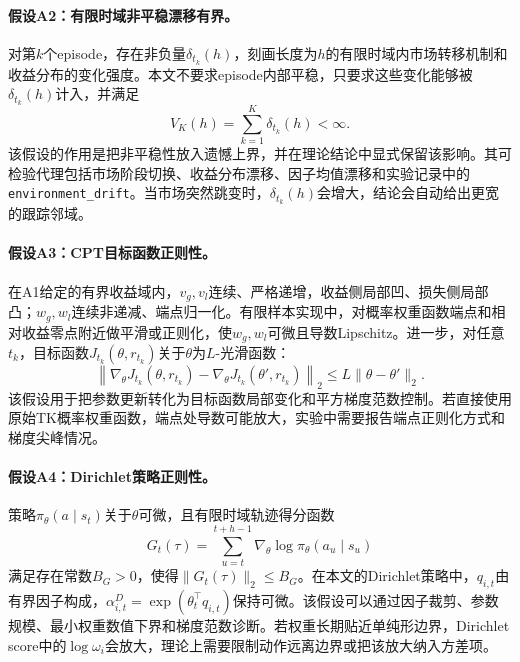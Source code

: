 \documentclass{sufethesismas}
\begin{document}
\paragraph{假设A2：有限时域非平稳漂移有界。}
对第$k$个episode，存在非负量$\delta_{t_k}(h)$，刻画长度为$h$的有限时域内市场转移机制和收益分布的变化强度。本文不要求episode内部平稳，只要求这些变化能够被$\delta_{t_k}(h)$计入，并满足
\begin{equation}
\label{eq:a2_local_drift}
V_K(h)
=
\sum_{k=1}^{K}\delta_{t_k}(h)
<\infty.
\end{equation}
该假设的作用是把非平稳性放入遗憾上界，并在理论结论中显式保留该影响。其可检验代理包括市场阶段切换、收益分布漂移、因子均值漂移和实验记录中的\texttt{environment\_drift}。当市场突然跳变时，$\delta_{t_k}(h)$会增大，结论会自动给出更宽的跟踪邻域。

\paragraph{假设A3：CPT目标函数正则性。}
在A1给定的有界收益域内，$v_g,v_l$连续、严格递增，收益侧局部凹、损失侧局部凸；$w_g,w_l$连续非递减、端点归一化。有限样本实现中，对概率权重函数端点和相对收益零点附近做平滑或正则化，使$w_g,w_l$可微且导数Lipschitz。进一步，对任意$t_k$，目标函数$J_{t_k}(\theta,r_{t_k})$关于$\theta$为$L$-光滑函数：
\begin{equation}
\label{eq:smooth}
\left\|
\nabla_\theta J_{t_k}(\theta,r_{t_k})
-
\nabla_\theta J_{t_k}(\theta',r_{t_k})
\right\|_2
\le
L\|\theta-\theta'\|_2.
\end{equation}
该假设用于把参数更新转化为目标函数局部变化和平方梯度范数控制。若直接使用原始TK概率权重函数，端点处导数可能放大，实验中需要报告端点正则化方式和梯度尖峰情况。

\paragraph{假设A4：Dirichlet策略正则性。}
策略$\pi_\theta(a\mid s_t)$关于$\theta$可微，且有限时域轨迹得分函数
\begin{equation}
\label{eq:score_def}
G_t(\tau)
=
\sum_{u=t}^{t+h-1}
\nabla_\theta \log \pi_\theta(a_u\mid s_u)
\end{equation}
满足存在常数$B_G>0$，使得$\|G_t(\tau)\|_2\le B_G$。在本文的Dirichlet策略中，$q_{i,t}$由有界因子构成，$\alpha^D_{i,t}=\exp(\theta_t^\top q_{i,t})$保持可微。该假设可以通过因子裁剪、参数规模、最小权重数值下界和梯度范数诊断。若权重长期贴近单纯形边界，Dirichlet score中的$\log\omega_i$会放大，理论上需要限制动作远离边界或把该放大纳入方差项。
\end{document}
